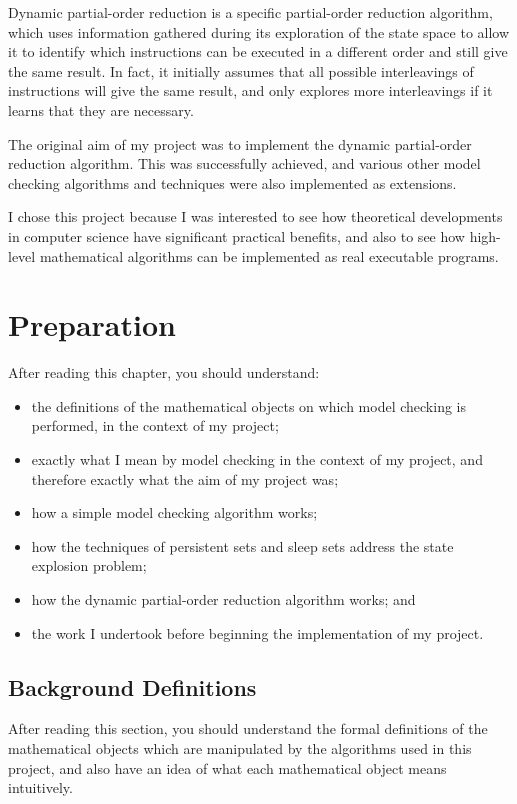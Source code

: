 \documentclass[12pt,a4paper,twoside,openright]{report}
\newenvironment{understandinglist}
	{\begin{itemize} \itemsep 0em}{\end{itemize}}
\begin{document}
Dynamic partial-order reduction is a
specific partial-order reduction algorithm,
which uses information gathered during its
exploration of the state space to allow it
to identify which instructions can be
executed in a different order and still give the
same result. In fact, it initially assumes that
all possible interleavings of instructions will
give the same result, and only explores
more interleavings if it learns that
they are necessary.

The original aim of my project was to
implement the dynamic partial-order
reduction algorithm. This was successfully
achieved, and various other model checking
algorithms and techniques were also
implemented as extensions.

I chose this
project because I was interested to see
how theoretical developments in computer
science have significant practical benefits,
and also to see how high-level mathematical
algorithms can be implemented as real
executable programs.

\chapter{Preparation}
\label{cha:prep}
After reading this chapter,
you should understand:
\begin{understandinglist}
	\item the definitions of the
	mathematical objects on which model
	checking is performed, in the context
	of my project;
	\item exactly what I mean by model checking
	in the context of my project, and therefore
	exactly what the aim of my project was;
	\item how a simple model checking algorithm
	works;
	\item how the techniques of persistent sets
	and sleep sets address the state explosion
	problem;
	\item how the dynamic partial-order
	reduction algorithm works; and
	\item the work I undertook before beginning
	the implementation of my project.
\end{understandinglist}

\section{Background Definitions} \label{sec:background-defs}
After reading this section, you should understand the
formal definitions of the mathematical objects
which are manipulated by the algorithms used in
this project, and also have an idea of
what each mathematical object means intuitively.
\end{document}
